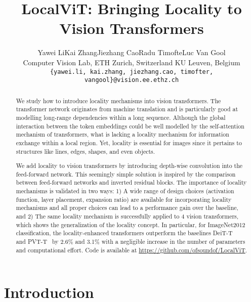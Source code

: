 \documentclass[10pt,twocolumn,letterpaper]{article}
\begin{document}
\title{LocalViT: Bringing Locality to Vision Transformers}




\author{Yawei Li\quad\quad Kai Zhang\quad\quad Jiezhang Cao\quad\quad Radu Timofte\quad\quad Luc Van Gool\\
Computer Vision Lab, ETH Zurich, Switzerland \qquad KU Leuven, Belgium\\
{\tt\small \{yawei.li, kai.zhang,  jiezhang.cao, timofter, vangool\}@vision.ee.ethz.ch}}



\maketitle


\begin{abstract}
We study how to introduce locality mechanisms into vision transformers. The transformer network originates from machine translation and is particularly good at modelling long-range dependencies within a long sequence. Although the global interaction between the token embeddings could be well modelled by the self-attention mechanism of transformers, what is lacking a locality mechanism for information exchange within a local region. Yet, locality is essential for images since it pertains to structures like lines, edges, shapes, and even objects. 

We add locality to vision transformers by introducing depth-wise convolution into the feed-forward network. This seemingly simple solution is inspired by the comparison between feed-forward networks and inverted residual blocks. The importance of locality mechanisms is validated in two ways: 1) A wide range of design choices (activation function, layer placement, expansion ratio) are available for incorporating locality mechanisms and all proper choices can lead to a performance gain over the baseline, and 2) The same locality mechanism is successfully applied to 4 vision transformers, which shows the generalization of the locality concept. In particular, for ImageNet2012 classification, the locality-enhanced transformers outperform the baselines DeiT-T~\cite{touvron2020training} and PVT-T~\cite{wang2021pyramid} by 2.6\% and 3.1\% with a negligible increase in the number of parameters and computational effort. Code is available at \url{https://github.com/ofsoundof/LocalViT}.
\end{abstract}

\section{Introduction}
\label{sec:introduction}
\end{document}
